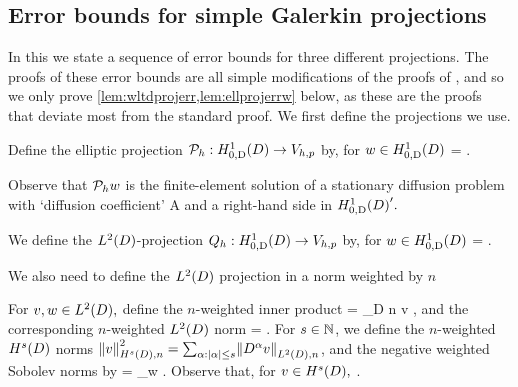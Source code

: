 \subsection{Error bounds for simple Galerkin projections}\label{sec:errgalerkin}
In this  we state a sequence of error bounds for three different projections. The proofs of these error bounds are all simple modifications of the proofs of \cite[Theorem 5.8.3]{BrSc:08},  and so we only prove \cref{lem:wltdprojerr,lem:ellprojerrw} below, as these are the proofs that deviate most from the standard proof.%
We first define the projections we use.

Define the elliptic projection $\Ph:\HozDD\rightarrow\Vhp$ by, for $w \in \HozDD$
\beqs
{} =  \tforall \vh \in \Vhp.
\eeqs

Observe that $\mathcal P_{h} w$ is the finite-element solution of a stationary diffusion problem with `diffusion coefficient' A and a right-hand side in $\HozDD'.$

We define the $\LtD$-projection $\Qh:\HozDD\rightarrow \Vhp$ by, for $w \in \HozDD$
\beqs
{} =  \tforall \vh \in \Vhp.
\eeqs

We also need to define the $\LtD$ projection in a norm weighted by $n$

For $v,w \in \LtD,$ define the $n$-weighted inner product
\beqs
{} = \int_{D} n v \wbar,
\eeqs
and the corresponding $n$-weighted $\LtD$ norm
\beqs
{} = .
\eeqs
For $s \in \mathbb N$, we define the $n$-weighted $\HsD$ norms $\NHsDn{v}^2 = \sum_{\alpha \st \abs{\alpha} \leq s}\NLtDn{D^\alpha v}$, and the negative weighted Sobolev norms by
\beq\label{eq:negweightnorm}
 = \sup_{w \in \HsD} .
\eeq
Observe that, for $v \in \HsD,$
\beq\label{eq:nconv}
\nmin{} \leq {} \leq {} .
\eeq

